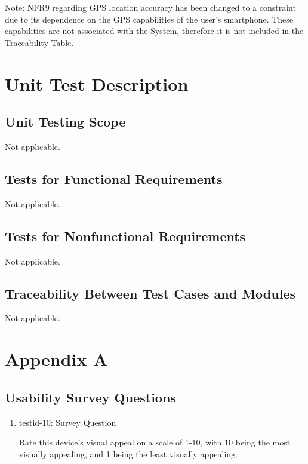 \documentclass[12pt, titlepage]{article}
\begin{document}
Note: NFR9 regarding GPS location accuracy has been changed to a constraint due to its dependence on the GPS capabilities of the user's smartphone. These capabilities are not associated with the System, therefore it is not included in the Traceability Table.

\section{Unit Test Description}
\label{Section 6}

\subsection{Unit Testing Scope}

Not applicable.

\subsection{Tests for Functional Requirements}

Not applicable.

\subsection{Tests for Nonfunctional Requirements}

Not applicable.

\subsection{Traceability Between Test Cases and Modules}

Not applicable.
				




\newpage

\section{Appendix A}

\subsection{Usability Survey Questions}

\begin{enumerate}

\item{testid-10: Survey Question}
\label{Survey}

Rate this device's visual appeal on a scale of 1-10, with 10 being the most visually appealing, and 1 being the least visually appealing.

\end{enumerate}
\end{document}
